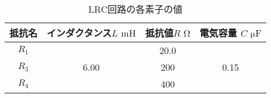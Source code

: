
\begin{table}[htb]
\centering
\caption{LRC回路の各素子の値}
\begin{tabular}{c|c|c|c}
\hline
\hline
抵抗名 & インダクタンス$L \,\, \si{\milli \henry}$ & 抵抗値$R \,\, \si{\ohm}$ & 電気容量 $C \,\, \si{\micro \farad}$ \\
\hline
$R_1$ & \multirow{3}{*}{6.00}	&20.0	& \multirow{3}{*}{0.15}	\\
\cline{1-1}\cline{3-3}
$R_3$ &						&200	&						\\
\cline{1-1}\cline{3-3}
$R_4$ &						&400	&						\\
\hline
\end{tabular}
\label{equip_vals}
\end{table}
